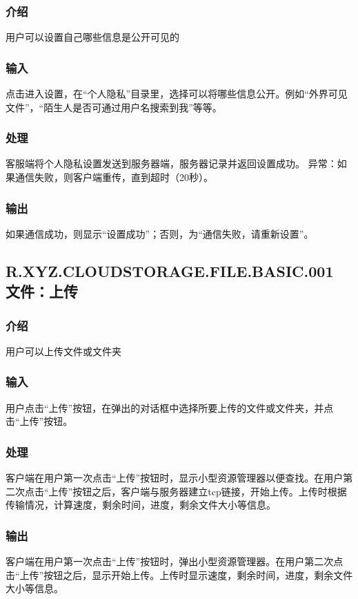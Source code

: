 {\subsubsection{介绍}
用户可以设置自己哪些信息是公开可见的
\subsubsection{输入}
点击进入设置，在“个人隐私”目录里，选择可以将哪些信息公开。例如“外界可见文件”，“陌生人是否可通过用户名搜索到我”等等。
\subsubsection{处理}
客服端将个人隐私设置发送到服务器端，服务器记录并返回设置成功。
异常：如果通信失败，则客户端重传，直到超时（20秒）。
\subsubsection{输出}
如果通信成功，则显示“设置成功”；否则，为“通信失败，请重新设置”。

}


\subsection{R.XYZ.CLOUDSTORAGE.FILE.BASIC.001 文件：上传}

\subsubsection{介绍}
用户可以上传文件或文件夹

\subsubsection{输入}
用户点击“上传”按钮，在弹出的对话框中选择所要上传的文件或文件夹，并点击“上传”按钮。

\subsubsection{处理}
客户端在用户第一次点击“上传”按钮时，显示小型资源管理器以便查找。在用户第二次点击“上传”按钮之后，客户端与服务器建立tcp链接，开始上传。上传时根据传输情况，计算速度，剩余时间，进度，剩余文件大小等信息。

\subsubsection{输出}
客户端在用户第一次点击“上传”按钮时，弹出小型资源管理器。在用户第二次点击“上传”按钮之后，显示开始上传。上传时显示速度，剩余时间，进度，剩余文件大小等信息。

